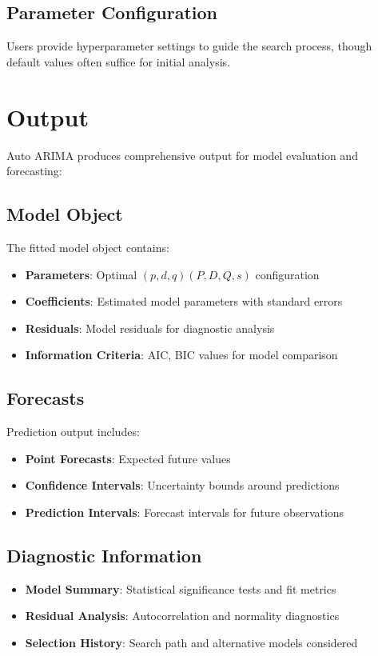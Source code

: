 \subsection{Parameter Configuration}
Users provide hyperparameter settings to guide the search process, though default values often suffice for initial analysis.

\section{Output}
\label{sec:output}

Auto ARIMA produces comprehensive output for model evaluation and forecasting:

\subsection{Model Object}
The fitted model object contains:
\begin{itemize}
	\item \textbf{Parameters}: Optimal $(p, d, q)(P, D, Q, s)$ configuration
	\item \textbf{Coefficients}: Estimated model parameters with standard errors
	\item \textbf{Residuals}: Model residuals for diagnostic analysis
	\item \textbf{Information Criteria}: AIC, BIC values for model comparison
\end{itemize}

\subsection{Forecasts}
Prediction output includes:
\begin{itemize}
	\item \textbf{Point Forecasts}: Expected future values
	\item \textbf{Confidence Intervals}: Uncertainty bounds around predictions
	\item \textbf{Prediction Intervals}: Forecast intervals for future observations
\end{itemize}

\subsection{Diagnostic Information}
\begin{itemize}
	\item \textbf{Model Summary}: Statistical significance tests and fit metrics
	\item \textbf{Residual Analysis}: Autocorrelation and normality diagnostics
	\item \textbf{Selection History}: Search path and alternative models considered
\end{itemize}

